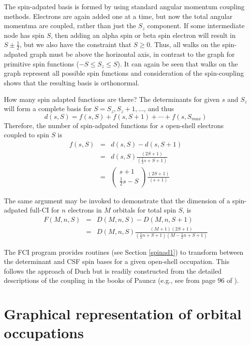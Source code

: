 \documentclass[fullpage,12pt,fleqn]{article}
\newcommand{\nCr}[2]{\left(\begin{array}{c} #1 \\ #2 \end{array}\right)}
\newcommand{\half}{\frac{1}{2}}
\begin{document}
 The spin-adpated basis is formed by using standard angular momentum
coupling methods.  Electrons are again added one at a time, but now
the total angular momentma are coupled, rather than just the $S_z$
component.  If some intermediate node has spin $S$, then adding an
alpha spin or beta spin electron will result in $S\pm\half $, but
we also have the constraint that $S \geq 0$.  Thus, all walks on the
spin-adpated graph must be above the horizontal axis, in contrast to
the graph for primitive spin functions ($-S \leq S_z \leq S$). It can
again be seen that walks on the graph represent all possible spin
functions and consideration of the spin-coupling shows that the
resulting basis is orthonormal.

How many spin adapted functions are there?  The determinants for given
$s$ and $S_z$ will form a complete basis for $S=S_z, S_z+1,\ldots$, and
thus
\begin{equation}
d(s,S) = f(s,S) + f(s,S+1) + \cdots + f(s,S_{max})
\end{equation}
Therefore, the number of spin-adpated functions for $s$ open-shell
electrons coupled to spin $S$ is
\begin{eqnarray}
f(s,S) & = & d(s,S) - d(s,S+1) \\
         & = & d(s,S) \frac{(2S + 1)}{(\half s + S + 1)} \\
         & = & \nCr{s+1}{\half s - S}\frac{(2S + 1)}{(s+1)}
\end{eqnarray}

The same argument may be invoked to demonstrate that the dimension
of a spin-adpated full-CI for $n$ electrons in $M$ orbitals for total
spin $S$, is
\begin{eqnarray}
 F(M,n,S) & = & D(M,n,S) - D(M,n,S+1) \\
          & = & D(M,n,S) \frac{(M+1)(2S+1)}{(\half n + S + 1)(M-\half n +S+1)}
\end{eqnarray}

The FCI program provides routines (see Section \ref{spinad1}) to
transform between the determinant and CSF spin bases for a given
open-shell occupation.  This follows the approach of Duch
\cite{duchspinad} but is readily constructed from the detailed
descriptions of the coupling in the books of Pauncz (e.g., see from
page 96 of \cite{paunczsym}).

\section{Graphical representation of orbital occupations}
\label{orbitalgraph}
\end{document}

